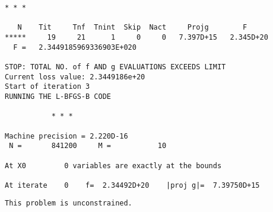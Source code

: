 \documentclass[11pt]{article}
\begin{document}
\begin{Verbatim}[commandchars=\\\{\}]
           * * *

   N    Tit     Tnf  Tnint  Skip  Nact     Projg        F
*****     19     21      1     0     0   7.397D+15   2.345D+20
  F =   2.3449185969336903E+020

STOP: TOTAL NO. of f AND g EVALUATIONS EXCEEDS LIMIT
Current loss value: 2.3449186e+20
Start of iteration 3
RUNNING THE L-BFGS-B CODE

           * * *

Machine precision = 2.220D-16
 N =       841200     M =           10

At X0         0 variables are exactly at the bounds

At iterate    0    f=  2.34492D+20    |proj g|=  7.39750D+15
    \end{Verbatim}

    \begin{Verbatim}[commandchars=\\\{\}]
 This problem is unconstrained.
    \end{Verbatim}
\end{document}
